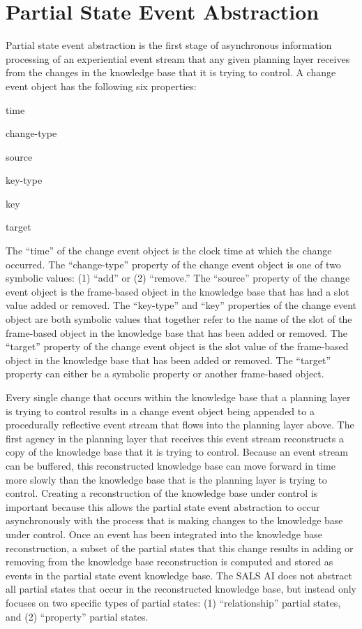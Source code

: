 \section{Partial State Event Abstraction}

Partial state event abstraction is the first stage of asynchronous
information processing of an experiential event stream that any given
planning layer receives from the changes in the knowledge base that it
is trying to control.  A change event object has the following six
properties:
\begin{packed_enumerate}
\item{time}
\item{change-type}
\item{source}
\item{key-type}
\item{key}
\item{target}
\end{packed_enumerate}
The ``time'' of the change event object is the clock time at which the
change occurred.  The ``change-type'' property of the change event
object is one of two symbolic values: (1) ``add'' or (2) ``remove.''
The ``source'' property of the change event object is the frame-based
object in the knowledge base that has had a slot value added or
removed.  The ``key-type'' and ``key'' properties of the change event
object are both symbolic values that together refer to the name of the
slot of the frame-based object in the knowledge base that has been
added or removed.  The ``target'' property of the change event object
is the slot value of the frame-based object in the knowledge base that
has been added or removed.  The ``target'' property can either be a
symbolic property or another frame-based object.

Every single change that occurs within the knowledge base that a
planning layer is trying to control results in a change event object
being appended to a procedurally reflective event stream that flows
into the planning layer above.  The first agency in the planning layer
that receives this event stream reconstructs a copy of the knowledge
base that it is trying to control.  Because an event stream can be
buffered, this reconstructed knowledge base can move forward in time
more slowly than the knowledge base that is the planning layer is
trying to control.  Creating a reconstruction of the knowledge base
under control is important because this allows the partial state event
abstraction to occur asynchronously with the process that is making
changes to the knowledge base under control.  Once an event has been
integrated into the knowledge base reconstruction, a subset of the
partial states that this change results in adding or removing from the
knowledge base reconstruction is computed and stored as events in the
partial state event knowledge base.  The SALS AI does not abstract all
partial states that occur in the reconstructed knowledge base, but
instead only focuses on two specific types of partial states: (1)
``relationship'' partial states, and (2) ``property'' partial states.

